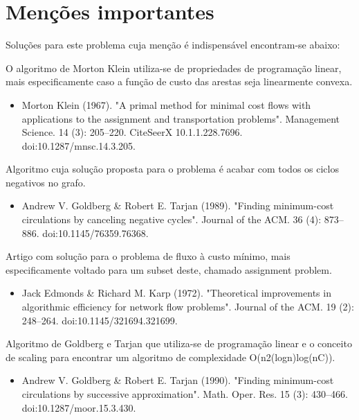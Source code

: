 \documentclass[12pt, a4]{article}
\begin{document}
\section{Menções importantes}
\label{sec:important-mentions}

Soluções para este problema cuja menção é indispensável encontram-se abaixo:

O algoritmo de Morton Klein utiliza-se de propriedades de programação linear,
mais especificamente caso a função de custo das arestas seja linearmente
convexa.

\begin{itemize}
\item Morton Klein (1967). "A primal method for minimal cost flows with
    applications to the assignment and transportation problems". Management
    Science. 14 (3): 205–220. CiteSeerX 10.1.1.228.7696.
    doi:10.1287/mnsc.14.3.205.
\end{itemize}

Algoritmo cuja solução proposta para o problema é acabar com todos os ciclos
negativos no grafo.

\begin{itemize}
\item Andrew V. Goldberg \& Robert E. Tarjan (1989). "Finding minimum-cost
    circulations by canceling negative cycles". Journal of the ACM. 36 (4):
    873–886. doi:10.1145/76359.76368.
\end{itemize}

Artigo com solução para o problema de fluxo à custo mínimo, mais especificamente
voltado para um subset deste, chamado assignment problem.

\begin{itemize}
\item Jack Edmonds \& Richard M. Karp (1972). "Theoretical improvements in
    algorithmic efficiency for network flow problems". Journal of the ACM. 19
    (2): 248–264. doi:10.1145/321694.321699.
\end{itemize}

Algoritmo de Goldberg e Tarjan que utiliza-se de programação linear e o conceito
de scaling para encontrar um algoritmo de complexidade O(n2(logn)log(nC)).

\begin{itemize}
\item Andrew V. Goldberg \& Robert E. Tarjan (1990). "Finding minimum-cost
circulations by successive approximation". Math. Oper. Res. 15 (3): 430–466.
doi:10.1287/moor.15.3.430.
\end{itemize}
\end{document}
